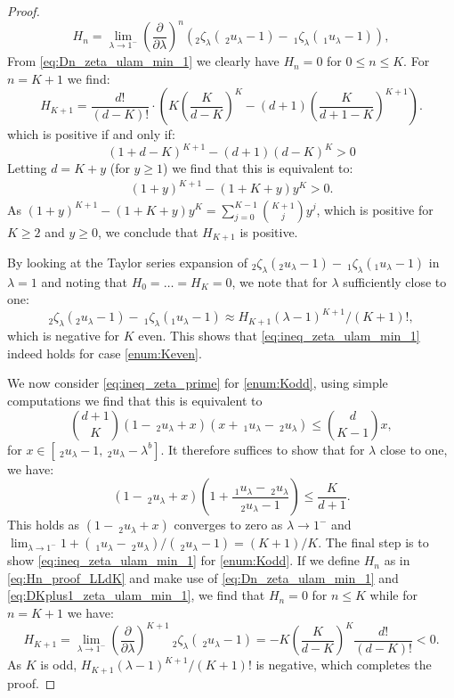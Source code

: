 \documentclass[12pt]{report}
\begin{document}
\begin{proof}
\begin{equation}
H_n=\lim_{\lambda \rightarrow 1^-} \left( \frac{\partial}{\partial \lambda} \right)^n \left(_2\zeta_\lambda(\ _2u_\lambda-1)-\ _1\zeta_\lambda(\ _1u_\lambda-1)\right),
\end{equation}
From \eqref{eq:Dn_zeta_ulam_min_1} we clearly have $H_n=0$ for $0 \leq n \leq K$. For $n=K+1$ we find:
$$
H_{K+1}
=
\frac{d!}{(d-K)!} \cdot \left( K \left( \frac{K}{d-K} \right)^K - (d+1) \left( \frac{K}{d+1-K} \right)^{K+1} \right).
$$
which is positive if and only if:
$$
(1+d-K)^{K+1} - (d+1) (d-K)^K > 0
$$
Letting $d=K+y$ (for $y \geq 1$) we find that this is equivalent to:
\begin{align*}
(1+y)^{K+1} - (1+K+y) y^K > 0.
\end{align*}
As $(1+y)^{K+1} - (1+K+y) y^K = \sum_{j=0}^{K-1} \binom{K+1}{j} y^j$, which is positive
for $K\geq 2$ and $y\geq 0$, we conclude that
$H_{K+1}$ is positive. 

By looking at the Taylor series expansion of $_2\zeta_\lambda(_2 u _\lambda - 1) -\ _1\zeta _\lambda(_1 u _\lambda - 1)$ in $\lambda=1$ and noting that $H_0 = \ldots = H_K = 0$, 
we note that for $\lambda$ sufficiently close to one:
$$_2\zeta_\lambda(_2 u _\lambda - 1) -\ _1\zeta _\lambda(_1 u _\lambda - 1) \approx
H_{K+1} (\lambda - 1)^{K+1}/(K+1)!,
$$
which is negative for $K$ even. This shows that \eqref{eq:ineq_zeta_ulam_min_1} indeed holds for case \ref{enum:Keven}.

We now consider \eqref{eq:ineq_zeta_prime} for \ref{enum:Kodd}, using simple computations we find that this is equivalent to
$$
\binom{d+1}{K} (1-\ _2u_\lambda + x) (x+\ _1 u_\lambda -\ _2 u _\lambda) \leq \binom{d}{K-1} x,
$$
for $x \in [\ _2u_\lambda-1, \ _2u_{\lambda}-\lambda^b]$.
It therefore suffices to show that for $\lambda$ close to one, we have:
$$
(1-\ _2u_{\lambda}+x) \left(1 + \frac{\ _1 u _\lambda -\ _2 u_\lambda}{_2 u_\lambda - 1} \right) \leq \frac{K}{d+1}.
$$
This holds as  $(1-\ _2u_{\lambda}+x)$ converges to zero as 
$\lambda \rightarrow 1^-$ and $\lim_{\lambda \rightarrow 1^-} 1 + (\  _1 u _\lambda -\ _2 u_\lambda)/(\ _2 u_\lambda - 1)  = (K+1)/K$.
\newline
The final step is to show \eqref{eq:ineq_zeta_ulam_min_1} for \ref{enum:Kodd}. If we define $H_n$ as in \eqref{eq:Hn_proof_LLdK} and make use of \eqref{eq:Dn_zeta_ulam_min_1} and \eqref{eq:DKplus1_zeta_ulam_min_1}, we find that $H_n=0$ for $n \leq K$ while for $n=K+1$ we have:
$$
H_{K+1}= \lim_{\lambda \rightarrow 1^-} \left( \frac{\partial}{\partial \lambda} \right)^{K+1}\ 
_2\zeta_\lambda(\ _2u_\lambda-1) = -K \left( \frac{K}{d-K} \right)^K \frac{d!}{(d-K)!} <0.
$$
As $K$ is odd, $H_{K+1} (\lambda - 1)^{K+1}/(K+1)!$ is negative, which completes the proof.
\end{proof}
\end{document}
